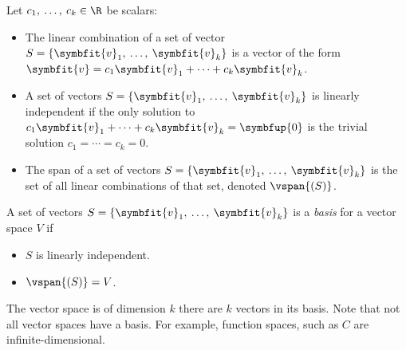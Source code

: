 \documentclass{article}
\begin{document}
\begin{multicols*}{3}
    Let \(c_1,\: \dots,\: c_k \in \R\) be scalars:
    \begin{itemize}
        \item The linear combination of a set of vector \(S = \left\{ \symbfit{v}_1,\: \dots,\: \symbfit{v}_k \right\}\)
              is a vector of the form \(\symbfit{v} = c_1 \symbfit{v}_1 + \cdots + c_k \symbfit{v}_k\).
        \item A set of vectors \(S = \left\{ \symbfit{v}_1,\: \dots,\: \symbfit{v}_k \right\}\) is linearly independent if
              the only solution to \(c_1 \symbfit{v}_1 + \cdots + c_k \symbfit{v}_k = \symbfup{0}\) is the trivial solution \(c_1 = \cdots = c_k = 0\).
        \item The span of a set of vectors \(S = \left\{ \symbfit{v}_1,\: \dots,\: \symbfit{v}_k \right\}\) is the set of all linear combinations of
              that set, denoted \(\vspan{\left( S \right)}\).
    \end{itemize}
    A set of vectors \(S = \left\{ \symbfit{v}_1,\: \dots,\: \symbfit{v}_k \right\}\) is a \textit{basis} for a vector space \(V\) if
    \begin{itemize}
        \item \(S\) is linearly independent.
        \item \(\vspan{\left( S \right)} = V\).
    \end{itemize}
    The vector space is of dimension \(k\) there are \(k\) vectors in its basis. Note that not all vector spaces have a basis. For example, function spaces, such as \(C\)
    are infinite-dimensional.


\end{multicols*}
\end{document}
